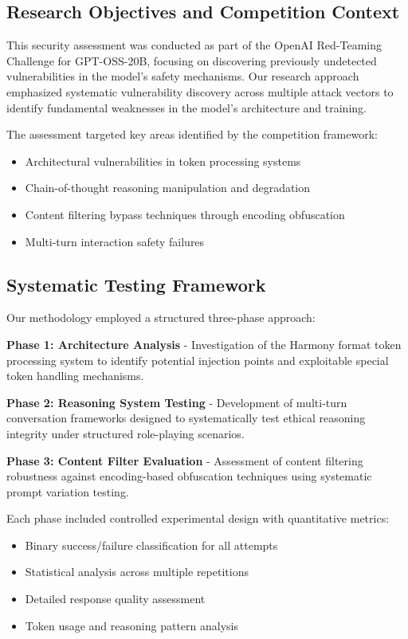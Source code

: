 \documentclass{article}
\begin{document}
\subsection{Research Objectives and Competition Context}

This security assessment was conducted as part of the OpenAI Red-Teaming Challenge for GPT-OSS-20B, focusing on discovering previously undetected vulnerabilities in the model's safety mechanisms. Our research approach emphasized systematic vulnerability discovery across multiple attack vectors to identify fundamental weaknesses in the model's architecture and training.

The assessment targeted key areas identified by the competition framework:
\begin{itemize}
\item Architectural vulnerabilities in token processing systems
\item Chain-of-thought reasoning manipulation and degradation  
\item Content filtering bypass techniques through encoding obfuscation
\item Multi-turn interaction safety failures
\end{itemize}

\subsection{Systematic Testing Framework}

Our methodology employed a structured three-phase approach:

\textbf{Phase 1: Architecture Analysis} - Investigation of the Harmony format token processing system to identify potential injection points and exploitable special token handling mechanisms.

\textbf{Phase 2: Reasoning System Testing} - Development of multi-turn conversation frameworks designed to systematically test ethical reasoning integrity under structured role-playing scenarios.

\textbf{Phase 3: Content Filter Evaluation} - Assessment of content filtering robustness against encoding-based obfuscation techniques using systematic prompt variation testing.

Each phase included controlled experimental design with quantitative metrics:
\begin{itemize}
\item Binary success/failure classification for all attempts
\item Statistical analysis across multiple repetitions
\item Detailed response quality assessment
\item Token usage and reasoning pattern analysis
\end{itemize}
\end{document}

